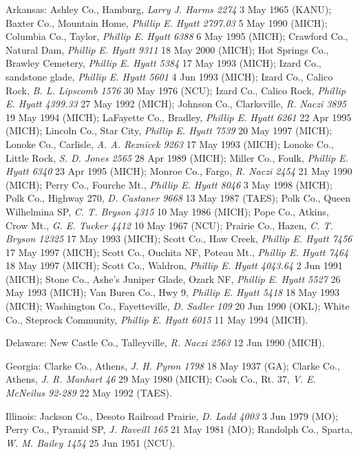 \documentclass{article}
\begin{document}
Arkansas:
Ashley Co., Hamburg, \textit{Larry J. Harms 2274} 3 May 1965 (KANU);
Baxter Co., Mountain Home, \textit{Phillip E. Hyatt 2797.03} 5 May 1990 (MICH);
Columbia Co., Taylor, \textit{Phillip E. Hyatt 6388} 6 May 1995 (MICH);
Crawford Co., Natural Dam, \textit{Phillip E. Hyatt 9311} 18 May 2000 (MICH);
Hot Springs Co., Brawley Cemetery, \textit{Phillip E. Hyatt 5384} 17 May 1993 (MICH);
Izard Co., sandstone glade, \textit{Phillip E. Hyatt 5601} 4 Jun 1993 (MICH);
Izard Co., Calico Rock, \textit{B. L. Lipscomb 1576} 30 May 1976 (NCU);
Izard Co., Calico Rock, \textit{Phillip E. Hyatt 4399.33} 27 May 1992 (MICH);
Johnson Co., Clarksville, \textit{R. Naczi 3895} 19 May 1994 (MICH);
LaFayette Co., Bradley, \textit{Phillip E. Hyatt 6261} 22 Apr 1995 (MICH);
Lincoln Co., Star City, \textit{Phillip E. Hyatt 7539} 20 May 1997 (MICH);
Lonoke Co., Carlisle, \textit{A. A. Reznicek 9263} 17 May 1993 (MICH);
Lonoke Co., Little Rock, \textit{S. D. Jones 2565} 28 Apr 1989 (MICH);
Miller Co., Foulk, \textit{Phillip E. Hyatt 6340} 23 Apr 1995 (MICH);
Monroe Co., Fargo, \textit{R. Naczi 2454} 21 May 1990 (MICH);
Perry Co., Fourche Mt., \textit{Phillip E. Hyatt 8046} 3 May 1998 (MICH);
Polk Co., Highway 270, \textit{D. Castaner 9668} 13 May 1987 (TAES);
Polk Co., Queen Wilhelmina SP, \textit{C. T. Bryson 4315} 10 May 1986 (MICH);
Pope Co., Atkins, Crow Mt., \textit{G. E. Tucker 4412} 10 May 1967 (NCU);
Prairie Co., Hazen, \textit{C. T. Bryson 12325} 17 May 1993 (MICH);
Scott Co., Haw Creek, \textit{Phillip E. Hyatt 7456} 17 May 1997 (MICH);
Scott Co., Ouchita NF, Poteau Mt., \textit{Phillip E. Hyatt 7464} 18 May 1997 (MICH);
Scott Co., Waldron, \textit{Phillip E. Hyatt 4043.64} 2 Jun 1991 (MICH);
Stone Co., Ashe's Juniper Glade, Ozark NF, \textit{Phillip E. Hyatt 5527} 26 May 1993 (MICH);
Van Buren Co., Hwy 9, \textit{Phillip E. Hyatt 5418} 18 May 1993 (MICH);
Washington Co., Fayetteville, \textit{D. Sadler 109} 20 Jun 1990 (OKL);
White Co., Steprock Community, \textit{Phillip E. Hyatt 6015} 11 May 1994 (MICH).

Delaware:
New Castle Co., Talleyville, \textit{R. Naczi 2563} 12 Jun 1990 (MICH). 

Georgia:
Clarke Co., Athens, \textit{J. H. Pyron 1798} 18 May 1937 (GA); 
Clarke Co., Athens, \textit{J. R. Manhart 46} 29 May 1980 (MICH); 
Cook Co., Rt. 37, \textit{V. E. McNeilus 92-289} 22 May 1992 (TAES). 

Illinois:
Jackson Co., Desoto Railroad Prairie, \textit{D. Ladd 4003} 3 Jun 1979 (MO); 
Perry Co., Pyramid SP, \textit{J. Raveill 165} 21 May 1981 (MO); 
Randolph Co., Sparta, \textit{W. M. Bailey 1454} 25 Jun 1951 (NCU). 
\end{document}

